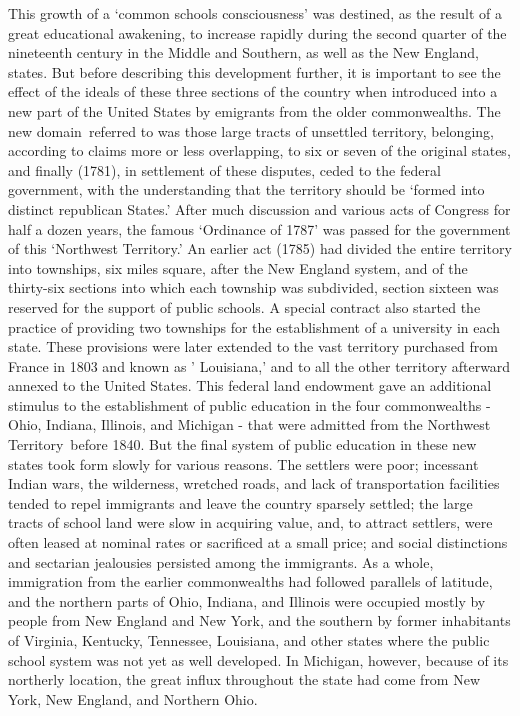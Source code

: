 \documentclass[
]{book}
\begin{document}
This growth of a `common schools consciousness' was destined, as the result of a great educational awakening, to increase rapidly during the second quarter of the nineteenth century in the Middle and Southern, as well as the New England, states. But before describing this development further, it is important to see the effect of the ideals of these three sections of the country when introduced into a new part of the United States by emigrants from the older commonwealths. The new domain~referred to was those large tracts of unsettled territory, belonging, according to claims more or less overlapping, to six or seven of the original states, and finally (1781), in settlement of these disputes, ceded to the federal government, with the understanding that the territory should be `formed into distinct republican States.' After much discussion and various acts of Congress for half a dozen years, the famous `Ordinance of 1787' was passed for the government of this `Northwest Territory.' An earlier act (1785) had divided the entire territory into townships, six miles square, after the New England system, and of the thirty-six sections into which each township was subdivided, section sixteen was reserved for the support of public schools. A special contract also started the practice of providing two townships for the establishment of a university in each state. These provisions were later extended to the vast territory purchased from France in 1803 and known as ' Louisiana,' and to all the other territory afterward annexed to the United States. This federal land endowment gave an additional stimulus to the establishment of public education in the four commonwealths - Ohio, Indiana, Illinois, and Michigan - that were admitted from the Northwest Territory~before 1840. But the final system of public education in these new states took form slowly for various reasons. The settlers were poor; incessant Indian wars, the wilderness, wretched roads, and lack of transportation facilities tended to repel immigrants and leave the country sparsely settled; the large tracts of school land were slow in acquiring value, and, to attract settlers, were often leased at nominal rates or sacrificed at a small price; and social distinctions and sectarian jealousies persisted among the immigrants. As a whole, immigration from the earlier commonwealths had followed parallels of latitude, and the northern parts of Ohio, Indiana, and Illinois were occupied mostly by people from New England and New York, and the southern by former inhabitants of Virginia, Kentucky, Tennessee, Louisiana, and other states where the public school system was not yet as well developed. In Michigan, however, because of its northerly location, the great influx throughout the state had come from New York, New England, and Northern Ohio.
\end{document}
